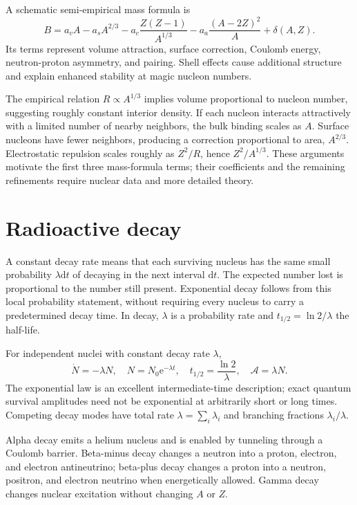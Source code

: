 \documentclass[11pt,oneside]{book}
\newcommand{\dd}{\mathrm{d}}
\newcommand{\ee}{\mathrm{e}}
\theoremstyle{reviewstyle}
\begin{document}
A schematic semi-empirical mass formula is
\begin{equation}B=a_vA-a_sA^{2/3}-a_c\frac{Z(Z-1)}{A^{1/3}}-a_a\frac{(A-2Z)^2}{A}+\delta(A,Z).\end{equation}
Its terms represent volume attraction, surface correction, Coulomb energy, neutron-proton asymmetry, and pairing. Shell effects cause additional structure and explain enhanced stability at magic nucleon numbers.

The empirical relation $R\propto A^{1/3}$ implies volume proportional to nucleon number, suggesting roughly constant interior density. If each nucleon interacts attractively with a limited number of nearby neighbors, the bulk binding scales as $A$. Surface nucleons have fewer neighbors, producing a correction proportional to area, $A^{2/3}$. Electrostatic repulsion scales roughly as $Z^2/R$, hence $Z^2/A^{1/3}$. These arguments motivate the first three mass-formula terms; their coefficients and the remaining refinements require nuclear data and more detailed theory.

\section{Radioactive decay}
A constant decay rate means that each surviving nucleus has the same small probability $\lambda\dd t$ of decaying in the next interval $\dd t$. The expected number lost is proportional to the number still present. Exponential decay follows from this local probability statement, without requiring every nucleus to carry a predetermined decay time. In decay, $\lambda$ is a probability rate and $t_{1/2}=\ln2/\lambda$ the half-life.

For independent nuclei with constant decay rate $\lambda$,
\begin{equation}\dot N=-\lambda N,\quad N=N_0\ee^{-\lambda t},\quad t_{1/2}=\frac{\ln2}{\lambda},\quad \mathcal A=\lambda N.\end{equation}
The exponential law is an excellent intermediate-time description; exact quantum survival amplitudes need not be exponential at arbitrarily short or long times. Competing decay modes have total rate $\lambda=\sum_i\lambda_i$ and branching fractions $\lambda_i/\lambda$.

Alpha decay emits a helium nucleus and is enabled by tunneling through a Coulomb barrier. Beta-minus decay changes a neutron into a proton, electron, and electron antineutrino; beta-plus decay changes a proton into a neutron, positron, and electron neutrino when energetically allowed. Gamma decay changes nuclear excitation without changing $A$ or $Z$.
\end{document}
